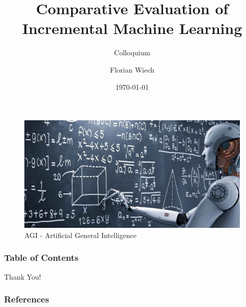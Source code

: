 \documentclass[t]{beamer}
\title{Comparative Evaluation of\\Incremental Machine Learning}
\subtitle{Colloquium}
\author{Florian Wiech}
\institute{University of Applied Sciences Fulda}
\date{\today}
\begin{document}
    \begin{frame}
        \begin{figure}[H]
            \centering
            \includegraphics[width=\textwidth]{agi}
            \caption{\cite{agi} AGI - Artificial General Intelligence}
            \label{fig:agi}
        \end{figure}
    \end{frame}

    \begin{frame}[c]
        \titlepage
    \end{frame}

    \begin{frame}
        \frametitle{Table of Contents}
        \tableofcontents
    \end{frame}
    
    

    

    

    \begin{frame}[c]
        \centering \Huge
        Thank You!
    \end{frame}

    \begin{frame}[allowframebreaks]
        \frametitle{References}
        \printbibliography
    \end{frame}
\end{document}
